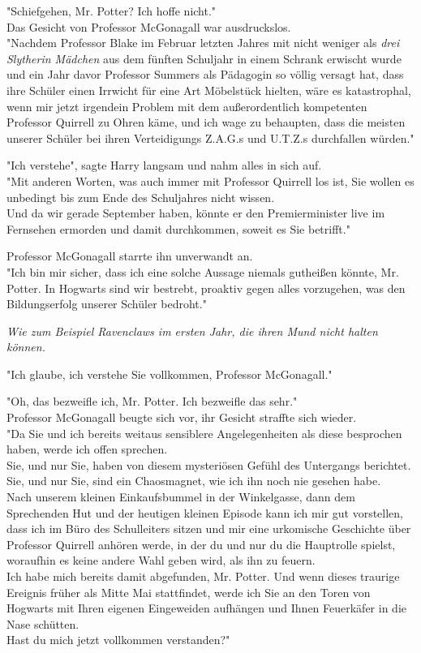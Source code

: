 {"Schiefgehen, Mr. Potter? Ich hoffe nicht."\\ Das Gesicht von Professor McGonagall war ausdruckslos.\\ "Nachdem Professor Blake im Februar letzten Jahres mit nicht weniger als \emph{drei Slytherin Mädchen} aus dem fünften Schuljahr in einem Schrank erwischt wurde und ein Jahr davor Professor Summers als Pädagogin so völlig versagt hat, dass ihre Schüler einen Irrwicht für eine Art Möbelstück hielten, wäre es katastrophal, wenn mir jetzt irgendein Problem mit dem außerordentlich kompetenten Professor Quirrell zu Ohren käme, und ich wage zu behaupten, dass die meisten unserer Schüler bei ihren Verteidigungs Z.A.G.s und U.T.Z.s durchfallen würden."

"Ich verstehe", sagte Harry langsam und nahm alles in sich auf.\\ "Mit anderen Worten, was auch immer mit Professor Quirrell los ist, Sie wollen es unbedingt bis zum Ende des Schuljahres nicht wissen.\\ Und da wir gerade September haben, könnte er den Premierminister live im Fernsehen ermorden und damit durchkommen, soweit es Sie betrifft."

Professor McGonagall starrte ihn unverwandt an.\\ "Ich bin mir sicher, dass ich eine solche Aussage niemals gutheißen könnte, Mr. Potter. In Hogwarts sind wir bestrebt, proaktiv gegen alles vorzugehen, was den Bildungserfolg unserer Schüler bedroht."

\emph{Wie zum Beispiel Ravenclaws im ersten Jahr, die ihren Mund nicht halten können.}

"Ich glaube, ich verstehe Sie vollkommen, Professor McGonagall."

"Oh, das bezweifle ich, Mr. Potter. Ich bezweifle das sehr."\\ Professor McGonagall beugte sich vor, ihr Gesicht straffte sich wieder.\\ "Da Sie und ich bereits weitaus sensiblere Angelegenheiten als diese besprochen haben, werde ich offen sprechen.\\ Sie, und nur Sie, haben von diesem mysteriösen Gefühl des Untergangs berichtet. Sie, und nur Sie, sind ein Chaosmagnet, wie ich ihn noch nie gesehen habe.\\ Nach unserem kleinen Einkaufsbummel in der Winkelgasse, dann dem Sprechenden Hut und der heutigen kleinen Episode kann ich mir gut vorstellen, dass ich im Büro des Schulleiters sitzen und mir eine urkomische Geschichte über Professor Quirrell anhören werde, in der du und nur du die Hauptrolle spielst, woraufhin es keine andere Wahl geben wird, als ihn zu feuern.\\ Ich habe mich bereits damit abgefunden, Mr. Potter. Und wenn dieses traurige Ereignis früher als Mitte Mai stattfindet, werde ich Sie an den Toren von Hogwarts mit Ihren eigenen Eingeweiden aufhängen und Ihnen Feuerkäfer in die Nase schütten.\\ Hast du mich jetzt vollkommen verstanden?"

}
